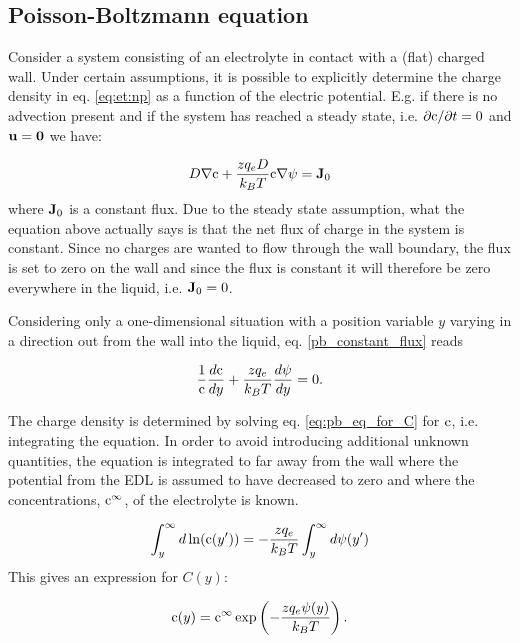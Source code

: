 \subsection{Poisson-Boltzmann equation}\label{sec:et:pb}
Consider a system consisting of an electrolyte in contact with a
(flat) charged wall.  Under certain assumptions, it is possible to
explicitly determine the charge density in eq. \eqref{eq:et:np} as a
function of the electric potential. E.g. if there is no advection
present and if the system has reached a steady state, i.e. $\partial
\mathrm{c} /\partial t = 0$ and $\mathbf{u} = \mathbf{0}$ we have:

\begin{equation}\label{pb_constant_flux}
D\nabla \mathrm{c} + \frac{zq_eD}{k_BT}\mathrm{c}\nabla\mathrm{\psi} = \mathbf{J}_0
\end{equation} 
where $\mathbf{J}_0$ is a constant flux. Due to the steady state
assumption, what the equation above actually says is that the net flux
of charge in the system is constant. Since no charges are wanted to
flow through the wall boundary, the flux is set to zero on the wall
and since the flux is constant it will therefore be zero everywhere in
the liquid, i.e. $\mathbf{J}_0 = 0$.

Considering only a one-dimensional situation with a position variable
$y$ varying in a direction out from the wall into the liquid,
eq. \eqref{pb_constant_flux} reads

\begin{equation}\label{eq:pb_eq_for_C}
\frac{1}{\mathrm{c}} \dfrac{d \mathrm{c}}{d y} + \frac{zq_e}{k_BT} \dfrac{d \mathrm{\psi}}{d
  y} = 0.
\end{equation}

The charge density is determined by solving eq. \eqref{eq:pb_eq_for_C}
for $\mathrm{c}$, i.e. integrating the equation. In order to avoid introducing
additional unknown quantities, the equation is integrated to far away
from the wall where the potential from the EDL is assumed to have
decreased to zero and where the concentrations, $\mathrm{c}^{\infty}$, of the
electrolyte is known.

\begin{equation}
\int_y^{\infty} d\ln( \mathrm{c}(y')) = -\frac{z q_e}{k_BT}\int_y^{\infty}d\mathrm{\psi}(y')
\end{equation}
This gives an expression for $C(y)$:

\begin{equation}\label{eq:C}
\mathrm{c}(y) = \mathrm{c}^{\infty} \exp\left(-\frac{z q_e \mathrm{\psi}(y)}{k_BT}\right).
\end{equation}


